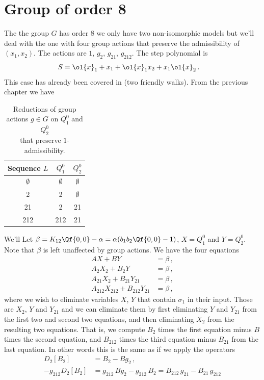 \section{Group of order 8}
The the group $G$ has order 8 we only have two non-isomorphic models but we'll deal with the one with four group actions that preserve the admissibility of $(x_1,x_2)$. The actions are $1,\, g_2,\, g_{21},\, g_{212}$. The step polynomial is
\begin{align}
S &= \ol{x}_1+x_1+\ol{x}_1x_2+x_1\ol{x}_2\,.
\end{align}
This case has already been covered in (two friendly walks). From the previous chapter we have
\begin{table}[H]
\caption{Reductions of group actions $g \in G$ on $Q_1^0$ and $Q_2^0$\\that preserve $1$-admissibility.}
\label{tbl:tableG6}
\centering
\begin{tabular}{ccc}
\toprule
	Sequence $L$ & $Q_1^0$ & $Q_2^0$ \\ 
\midrule
	$\emptyset$ & $\emptyset$ & $\emptyset$ \\
	2 &  2& $\emptyset$ \\
	21 &  2 & 21   \\
	212 &  212 & 21  \\
\bottomrule
\end{tabular}
\end{table}
We'll 
Let $\beta = K_{12}\Qf{0,0} - \alpha = \alpha(b_1b_2\Qf{0,0}-1)$, $X = Q_1^0$ and $Y = Q_2^0$. Note that $\beta$ is left unaffected by group actions. We have the four equations
\begin{align}
	AX+BY&= \beta\,, \\
	A_2 X_2 + B_2 Y &=\beta\,,\\
	A_{21}X_2+ B_{21}Y_{21} &= \beta\,, \\
	A_{212} X_{212} + B_{212} Y_{21}&= \beta\,,
\end{align}
where we wish to eliminate variables $X$, $Y$ that contain $\sigma_1$ in their input. Those are $X_2$, $Y$ and $Y_{21}$ and we can eliminate them by first eliminating $Y$ and $Y_{21}$ from the first two and second two equations, and then eliminating $X_2$ from the resulting two equations. That is, we compute $B_2$ times the first equation minus $B$ times the second equation, and $B_{212}$ times the third equation minus $B_{21}$ from the last equation. In other words this is the same as if we apply the operators
\begin{align}
	D_2[B_2] &= B_2 - B g_2\,,\\
	- g_{212}D_2[B_2] &= g_{212}\,B g_2 - g_{212}\,B_2 =  B_{212} \,g_{21} - B_{21}\,  g_{212} 
\end{align}
